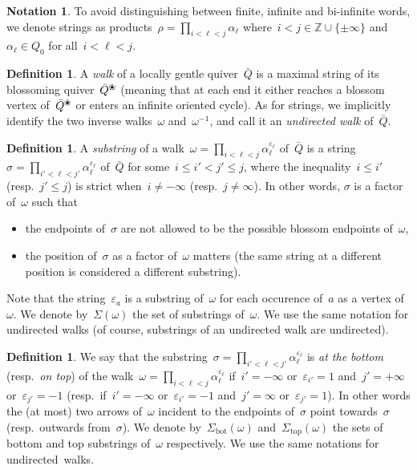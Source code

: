 \documentclass{amsart}
\theoremstyle{definition}
\newtheorem{definition}[theorem]{Definition}
\newtheorem{notation}[theorem]{Notation}
\newcommand{\Z}{\mathbb{Z}} %
\newcommand{\set}[2]{\left\{ #1 \;\middle|\; #2 \right\}} %
\newcommand{\eqdef}{\mbox{\,\raisebox{0.2ex}{\scriptsize\ensuremath{\mathrm:}}\ensuremath{=}\,}} %
\newcommand{\darkblue}{\color{darkblue}} %
\newcommand{\defn}[1]{\textsl{\darkblue #1}} %
\newcommand{\blossom}{^\text{\ding{96}}} %
\renewcommand{\top}{\mathrm{top}} %
\newcommand{\bottom}{\mathrm{bot}} %
\begin{document}
\begin{notation}
To avoid distinguishing between finite, infinite and bi-infinite words, we denote strings as products~$\rho = \prod_{i < \ell < j} \alpha_\ell$ where~$i < j \in \Z \cup \{\pm \infty\}$ and~$\alpha_\ell \in Q_0$ for all~$i < \ell < j$.
\end{notation}

\begin{definition}
\label{def:walk}
A \defn{walk} of a locally gentle quiver~$\bar Q$ is a maximal string of its blossoming quiver~$\bar Q \blossom$ (meaning that at each end it either reaches a blossom vertex of~$\bar Q \blossom$ or enters an infinite oriented cycle).
As for strings, we implicitly identify the two inverse walks~$\omega$ and~$\omega^{-1}$, and call it an \defn{undirected walk} of~$\bar Q$.
\end{definition}

\begin{definition}
\label{def:substrings}
A \defn{substring} of a walk~$\omega = \prod_{i < \ell < j} \alpha_\ell^{\varepsilon_\ell}$ of~$\bar Q$ is a string~$\sigma = \prod_{i' < \ell < j'} \alpha_\ell^{\varepsilon_\ell}$ of~$\bar Q$ for some~$i \le i' < j' \le j$, where the inequality~$i \le i'$ (resp.~$j' \le j$) is strict when~$i \ne -\infty$ (resp.~$j \ne \infty$). In other words, $\sigma$ is a factor of~$\omega$ such that
\begin{itemize}
\item the endpoints of~$\sigma$ are not allowed to be the possible blossom endpoints of~$\omega$,
\item the position of~$\sigma$ as a factor of~$\omega$ matters (the same string at a different position is considered a different substring).
\end{itemize}
Note that the string~$\varepsilon_a$ is a substring of~$\omega$ for each occurence of~$a$ as a vertex of~$\omega$.
We denote by~$\Sigma(\omega)$ the set of substrings of~$\omega$.
We use the same notation for undirected walks (of course, substrings of an undirected walk are undirected).
\end{definition}

\begin{definition}
\label{def:topBottom}
We say that the substring~$\sigma = \prod_{i' < \ell < j'} \alpha_\ell^{\varepsilon_\ell}$ is \defn{at the bottom} (resp.~\defn{on top}) of the walk~$\omega = \prod_{i < \ell < j} \alpha_\ell^{\varepsilon_\ell}$ if~$i'=-\infty$ or~$\varepsilon_{i'} = 1$ and~$j'=+\infty$ or~$\varepsilon_{j'} = -1$ (resp.~if~$i'=-\infty$ or~$\varepsilon_{i'} = -1$ and~$j'=\infty$ or~$\varepsilon_{j'} = 1$).
In other words the (at most) two arrows of~$\omega$ incident to the endpoints of~$\sigma$ point towards~$\sigma$ (resp.~outwards from~$\sigma$).
We denote by~$\Sigma_\bottom(\omega)$ and~$\Sigma_\top(\omega)$ the sets of bottom and top substrings of~$\omega$ respectively.
We use the same notations for undirected~walks.
\end{definition}
\end{document}
